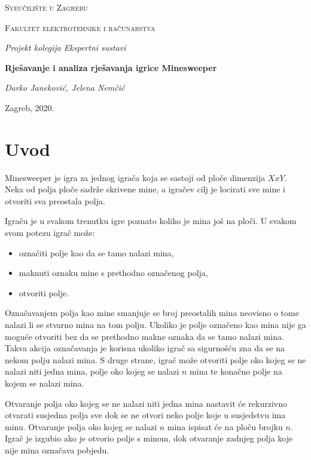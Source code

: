 \documentclass{article}
\begin{document}
\begin{titlepage}
	\centering
	{\scshape\LARGE Sveučilište u Zagrebu\par}
	\vspace{0.5cm}
	{\scshape\Large Fakultet elektrotehnike i računarstva\par}
    \vfill
	{\Large\itshape Projekt kolegija Ekspertni sustavi \par}
	\vspace{0.5cm}
	{\huge\bfseries Rješavanje i analiza rješavanja igrice Minesweeper\par}
	\vspace{0.5cm}
	{\Large\itshape Darko Janeković, Jelena Nemčić \par}
	\vfill
	{\large Zagreb, 2020.}
\end{titlepage}

\section{Uvod}

Minesweeper je igra za jednog igrača koja se sastoji od ploče dimenzija $X x Y$. Neka od polja ploče sadrže skrivene mine, a igračev cilj je locirati sve mine i otvoriti sva preostala polja.

Igraču je u svakom trenutku igre poznato koliko je mina još na ploči. U svakom svom potezu igrač može:
\begin{itemize}
    \item označiti polje kao da se tamo nalazi mina,
    \item maknuti oznaku mine s prethodno označenog polja,
    \item otvoriti polje.
\end{itemize} 

Označavanjem polja kao mine smanjuje se broj preostalih mina neovisno o tome nalazi li se stvarno mina na tom polju. Ukoliko je polje označeno kao mina nije ga moguće otvoriti bez da se prethodno makne oznaka da se tamo
nalazi mina. Takva akcija označavanja je korisna ukoliko igrač sa sigurnošću zna da se na nekom polju
nalazi mina. S druge strane, igrač može otvoriti polje oko kojeg se ne nalazi niti jedna
mina, polje oko kojeg se nalazi $n$ mina te konačno polje na kojem se nalazi mina.

Otvaranje polja oko kojeg se ne nalazi niti jedna mina nastavit će rekurzivno otvarati susjedna
polja sve dok se ne otvori neko polje koje u susjedstvu ima minu. Otvaranje polja oko kojeg
se nalazi $n$ mina ispisat će na ploču brojku $n$. Igrač je izgubio ako je otvorio polje s minom, dok otvaranje zadnjeg polja koje nije mina
označava pobjedu.
\end{document}
